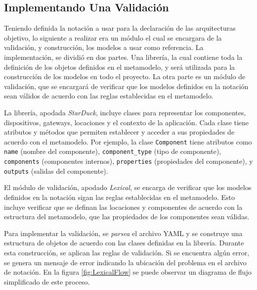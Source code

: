 \subsection{Implementando Una Validación}

Teniendo definida la notación a usar para la declaración de las arquitecturas objetivo, lo siguiente a realizar era un módulo el cual se encargara de la validación, y construcción, los modelos a usar como referencia. La implementación, se dividió en dos partes. Una librería, la cual contiene toda la definición de los objetos definidos en el metamodelo, y será utilizada para la construcción de los modelos en todo el proyecto. La otra parte es un módulo de validación, que se encargará de verificar que los modelos definidos en la notación sean válidos de acuerdo con las reglas establecidas en el metamodelo.

La librería, apodada \textit{StarDuck}, incluye clases para representar los componentes, dispositivos, gateways, locaciones y el contexto de la aplicación. Cada clase tiene atributos y métodos que permiten establecer y acceder a sus propiedades de acuerdo con el metamodelo. Por ejemplo, la clase \texttt{Component} tiene atributos como \texttt{name} (nombre del componente), \texttt{component\_type} (tipo de componente), \texttt{components} (componentes internos), \texttt{properties} (propiedades del componente), y \texttt{outputs} (salidas del componente).

El módulo de validación, apodado \textit{Lexical}, se encarga de verificar que los modelos definidos en la notación sigan las reglas establecidas en el metamodelo. Esto incluye verificar que se definan las locaciones y componentes de acuerdo con la estructura del metamodelo, que las propiedades de los componentes sean válidas.

Para implementar la validación, se \textit{parsea} el archivo YAML y se construye una estructura de objetos de acuerdo con las clases definidas en la librería. Durante esta construcción, se aplican las reglas de validación. Si se encuentra algún error, se genera un mensaje de error indicando la ubicación del problema en el archivo de notación. En la figura \ref{fig:LexicalFlow} se puede observar un diagrama de flujo simplificado de este proceso.

